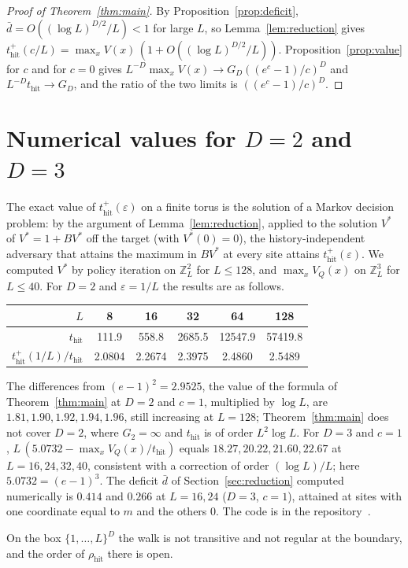 \documentclass[11pt]{amsart}
\theoremstyle{remark}
\newcommand{\eps}{\varepsilon}
\newcommand{\Z}{\mathbb{Z}}
\newcommand{\thit}{t_{\mathrm{hit}}}
\newcommand{\rhit}{\rho_{\mathrm{hit}}}
\begin{document}
\begin{proof}[Proof of Theorem~\ref{thm:main}]
By Proposition~\ref{prop:deficit}, $\bar d=O((\log L)^{D/2}/L)<1$ for large $L$, so Lemma~\ref{lem:reduction} gives
$\thit^+(c/L)=\max_xV(x)\,(1+O((\log L)^{D/2}/L))$. Proposition~\ref{prop:value} for $c$ and for $c=0$ gives
$L^{-D}\max_xV(x)\to G_D((e^c-1)/c)^D$ and $L^{-D}\thit\to G_D$, and the ratio of the two limits is $((e^c-1)/c)^D$.
\end{proof}

\section{Numerical values for $D=2$ and $D=3$}\label{sec:checks}

The exact value of $\thit^+(\eps)$ on a finite torus is the solution of a Markov decision problem: by
the argument of Lemma~\ref{lem:reduction}, applied to the solution $V^*$ of $V^*=1+BV^*$ off the target (with
$V^*(0)=0$), the history-independent adversary that attains the maximum in $BV^*$ at every site attains
$\thit^+(\eps)$. We computed $V^*$ by policy iteration on $\Z_L^2$ for $L\le128$, and $\max_xV_Q(x)$ on $\Z_L^3$ for
$L\le40$. For $D=2$ and $\eps=1/L$ the results are as follows.
\begin{center}
\begin{tabular}{rccccc}
\toprule
$L$ & 8 & 16 & 32 & 64 & 128\\ \midrule
$\thit$ & 111.9 & 558.8 & 2685.5 & 12547.9 & 57419.8\\
$\thit^+(1/L)/\thit$ & 2.0804 & 2.2674 & 2.3975 & 2.4860 & 2.5489\\ \bottomrule
\end{tabular}
\end{center}
The differences from $(e-1)^2=2.9525$, the value of the formula of Theorem~\ref{thm:main} at $D=2$ and $c=1$, multiplied by $\log L$, are $1.81,1.90,1.92,1.94,1.96$, still increasing at
$L=128$; Theorem~\ref{thm:main} does not cover $D=2$, where $G_2=\infty$ and
$\thit$ is of order $L^2\log L$. For $D=3$ and $c=1$, $L\,(5.0732-\max_xV_Q(x)/\thit)$ equals $18.27,20.22,21.60,22.67$ at
$L=16,24,32,40$, consistent with a correction of order $(\log L)/L$; here $5.0732=(e-1)^3$. The deficit $\bar d$ of
Section~\ref{sec:reduction} computed numerically is $0.414$ and $0.266$ at $L=16,24$ ($D=3$, $c=1$), attained at sites
with one coordinate equal to $m$ and the others $0$. The code is in the repository~\cite{Code}.

On the box $\{1,\dots,L\}^D$ the walk is not transitive and not regular at the boundary, and the order of $\rhit$
there is open.
\end{document}
